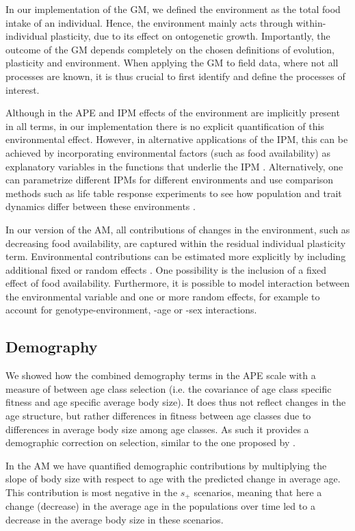 In our implementation of the GM, we defined the environment as the total food intake of an individual. Hence, the environment mainly acts through within-individual plasticity, due to its effect on ontogenetic growth. Importantly, the outcome of the GM depends completely on the chosen definitions of evolution, plasticity and environment. When applying the GM to field data, where not all processes are known, it is thus crucial to first identify and define the processes of interest.

Although in the APE and IPM effects of the environment are implicitly present in all terms, in our implementation there is no explicit quantification of this environmental effect. However, in alternative applications of the IPM, this can be achieved by incorporating environmental factors (such as food availability) as explanatory variables in the functions that underlie the IPM \parencite{vindenes2011}. Alternatively, one can parametrize different IPMs for different environments \parencite[e.g.][]{Ozgul2010} and use comparison methods such as life table response experiments to see how population and trait dynamics differ between these environments \parencite{rees2009}.

In our version of the AM, all contributions of changes in the environment, such as decreasing food availability, are captured within the residual individual plasticity term. Environmental contributions can be estimated more explicitly by including additional fixed or random effects \parencite{Charmantier2014}. One possibility is the inclusion of a fixed effect of food availability. Furthermore, it is possible to model interaction between the environmental variable and one or more random effects, for example to account for genotype-environment, -age or -sex interactions. 

\subsection*{Demography}
We showed how the combined demography terms in the APE scale with a measure of between age class selection (i.e. the covariance of age class specific fitness and age specific average body size). It does thus not reflect changes in the age structure, but rather differences in fitness between age classes due to differences in average body size among age classes. As such it provides a demographic correction on selection, similar to the one proposed by \cite{engen2014b}.

In the AM we have quantified demographic contributions by multiplying the slope of body size with respect to age with the predicted change in average age. This contribution is most negative in the $s_+$ scenarios, meaning that here a change (decrease) in the average age in the populations over time led to a decrease in the average body size in these scenarios. 

